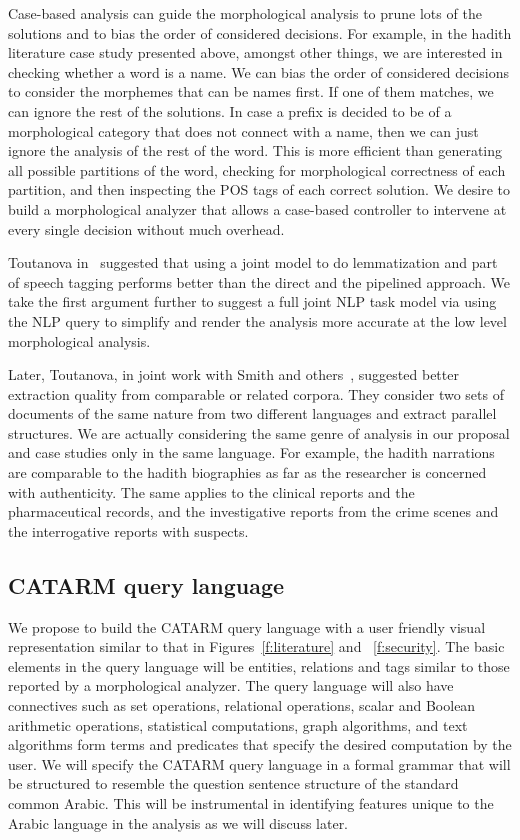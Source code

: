 \documentclass[12pt]{article}
\begin{document}
Case-based analysis can guide the morphological analysis
to prune lots of the solutions and to bias the order of considered
decisions. 
For example, in the hadith literature case study presented above, 
amongst other things, we are interested in checking whether a 
word is a name.  
We can bias the order of considered decisions to consider the 
morphemes that can be names first. 
If one of them matches, we can ignore the rest of the solutions. 
In case a prefix is decided to be of a morphological category
that does not connect with a name, then we can just ignore
the analysis of the rest of the word. 
This is more efficient than generating all possible partitions
of the word, checking for morphological correctness of each 
partition, and then inspecting the POS tags of each
correct solution. 
We desire to build a morphological analyzer that allows a 
case-based controller to intervene at every single decision
without much overhead. 

Toutanova in~\cite{Tou09} suggested that using 
a joint model to do lemmatization and part of speech 
tagging performs better
than the direct and the pipelined approach. 
We take the first argument further to suggest a full joint NLP task 
model via using the NLP query to simplify and render the analysis
more accurate at the low level morphological analysis.

Later, Toutanova, in joint work with Smith and others~\cite{Smi10},
suggested better extraction quality from comparable or related
corpora. 
They consider two sets of documents of the same nature from
two different languages and extract parallel structures. 
We are actually considering the same genre of analysis in 
our proposal and case studies only in the same language. 
For example, the hadith narrations are comparable to the hadith 
biographies as far as the researcher is concerned with authenticity.
The same applies to the clinical reports and the pharmaceutical 
records, and the investigative reports from the crime scenes
and the interrogative reports with suspects.

\subsection{CATARM query language}
\label{s:design:query}

We propose to build 
the CATARM query language with a user friendly
visual representation similar to that in Figures~\ref{f:literature} and
~\ref{f:security}. 
The basic elements in the query language will be entities, relations
and tags similar to those reported by a morphological analyzer. 
The query language will also have connectives such as set operations, 
relational operations, 
scalar and Boolean arithmetic operations, 
statistical computations, graph algorithms, and text algorithms
form terms and predicates that specify the desired computation
by the user. 
We will specify the CATARM query language in a formal grammar
that will be structured to resemble the question sentence
structure of the standard common Arabic.
This will be instrumental in identifying features
unique to the Arabic language in the analysis as we will
discuss later. 
\end{document}
